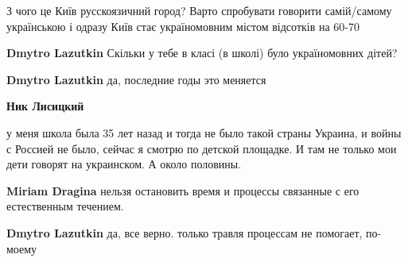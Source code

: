 \begin{itemize}
З чого це Київ русскоязичний город? Варто спробувати говорити самій/самому
українською і одразу Київ стає україномовним містом відсотків на 60-70

\begin{itemize}
 
\textbf{Dmytro Lazutkin} Скільки у тебе в класі (в школі) було україномовних дітей? \Smiley[1.0][yellow]

 
\textbf{Dmytro Lazutkin} да, последние годы это меняется

 
\textbf{Ник Лисицкий} 

у меня школа была 35 лет назад и тогда не было такой страны Украина, и войны с
Россией не было, сейчас я смотрю по детской площадке. И там не только мои дети
говорят на украинском. А около половины.


 
\textbf{Miriam Dragina} нельзя остановить время и процессы связанные с его естественным течением.

 
\textbf{Dmytro Lazutkin} да, все верно. только травля процессам не помогает, по-моему

 

\end{itemize}
\end{itemize}
